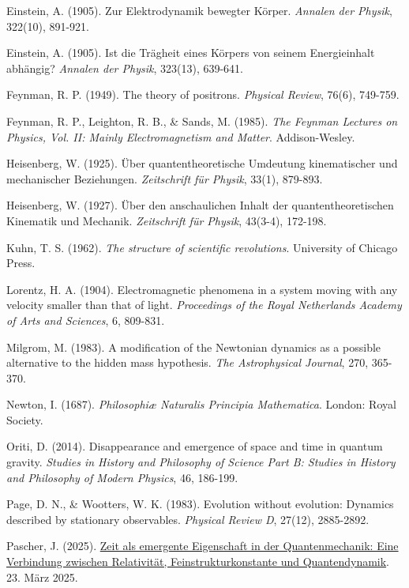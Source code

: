 \documentclass[a4paper,12pt]{article}
\begin{document}
\begin{thebibliography}{99}
		 Einstein, A. (1905). Zur Elektrodynamik bewegter Körper. \textit{Annalen der Physik}, 322(10), 891-921.
		
		 Einstein, A. (1905). Ist die Trägheit eines Körpers von seinem Energieinhalt abhängig? \textit{Annalen der Physik}, 323(13), 639-641.
		
		 Feynman, R. P. (1949). The theory of positrons. \textit{Physical Review}, 76(6), 749-759.
		
		 Feynman, R. P., Leighton, R. B., \& Sands, M. (1985). \textit{The Feynman Lectures on Physics, Vol. II: Mainly Electromagnetism and Matter}. Addison-Wesley.
		
		 Heisenberg, W. (1925). Über quantentheoretische Umdeutung kinematischer und mechanischer Beziehungen. \textit{Zeitschrift für Physik}, 33(1), 879-893.
		
		 Heisenberg, W. (1927). Über den anschaulichen Inhalt der quantentheoretischen Kinematik und Mechanik. \textit{Zeitschrift für Physik}, 43(3-4), 172-198.
		
		 Kuhn, T. S. (1962). \textit{The structure of scientific revolutions}. University of Chicago Press.
		
		 Lorentz, H. A. (1904). Electromagnetic phenomena in a system moving with any velocity smaller than that of light. \textit{Proceedings of the Royal Netherlands Academy of Arts and Sciences}, 6, 809-831.
		
		 Milgrom, M. (1983). A modification of the Newtonian dynamics as a possible alternative to the hidden mass hypothesis. \textit{The Astrophysical Journal}, 270, 365-370.
		
		 Newton, I. (1687). \textit{Philosophiæ Naturalis Principia Mathematica}. London: Royal Society.
		
		 Oriti, D. (2014). Disappearance and emergence of space and time in quantum gravity. \textit{Studies in History and Philosophy of Science Part B: Studies in History and Philosophy of Modern Physics}, 46, 186-199.
		
		 Page, D. N., \& Wootters, W. K. (1983). Evolution without evolution: Dynamics described by stationary observables. \textit{Physical Review D}, 27(12), 2885-2892.
		
		 Pascher, J. (2025). \href{https://github.com/jpascher/T0-Time-Mass-Duality/tree/main/2/pdf/Deutsch/ZeitEmergentQM.pdf}{Zeit als emergente Eigenschaft in der Quantenmechanik: Eine Verbindung zwischen Relativität, Feinstrukturkonstante und Quantendynamik}. 23. März 2025.
		

\end{thebibliography}
\end{document}
